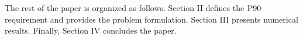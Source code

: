 \documentclass[conference]{IEEEtran}
\begin{document}




The rest of the paper is organized as follows. Section II defines the $\rm{P90}$ requirement and provides the problem formulation. Section III presents numerical results. Finally, Section IV concludes the paper. 


\vspace{2mm}
\end{document}
